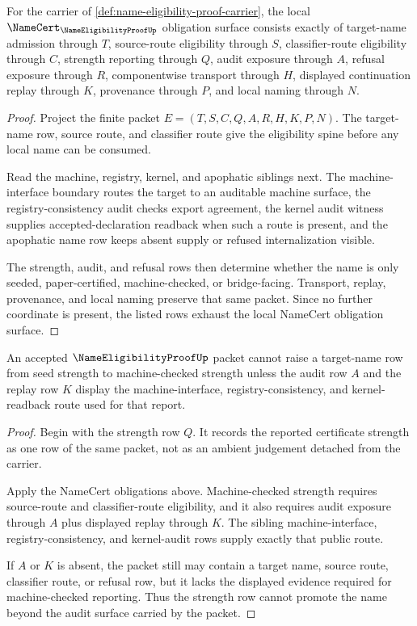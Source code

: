 \begin{theorem}
\label{thm:name-eligibility-proof-namecert-obligations}
For the carrier of \autoref{def:name-eligibility-proof-carrier}, the local $\NameCert_{\NameEligibilityProofUp}$ obligation surface consists exactly of target-name admission through $T$, source-route eligibility through $S$, classifier-route eligibility through $C$, strength reporting through $Q$, audit exposure through $A$, refusal exposure through $R$, componentwise transport through $H$, displayed continuation replay through $K$, provenance through $P$, and local naming through $N$.
\end{theorem}
\begin{proof}
Project the finite packet $E=(T,S,C,Q,A,R,H,K,P,N)$. The target-name row, source route, and classifier route give the eligibility spine before any local name can be consumed.

Read the machine, registry, kernel, and apophatic siblings next. The machine-interface boundary routes the target to an auditable machine surface, the registry-consistency audit checks export agreement, the kernel audit witness supplies accepted-declaration readback when such a route is present, and the apophatic name row keeps absent supply or refused internalization visible.

The strength, audit, and refusal rows then determine whether the name is only seeded, paper-certified, machine-checked, or bridge-facing. Transport, replay, provenance, and local naming preserve that same packet. Since no further coordinate is present, the listed rows exhaust the local NameCert obligation surface.
\end{proof}

\begin{theorem}
\label{thm:name-eligibility-proof-strength-noninflation}
An accepted $\NameEligibilityProofUp$ packet cannot raise a target-name row from seed strength to machine-checked strength unless the audit row $A$ and the replay row $K$ display the machine-interface, registry-consistency, and kernel-readback route used for that report.
\end{theorem}
\begin{proof}
Begin with the strength row $Q$. It records the reported certificate strength as one row of the same packet, not as an ambient judgement detached from the carrier.

Apply the NameCert obligations above. Machine-checked strength requires source-route and classifier-route eligibility, and it also requires audit exposure through $A$ plus displayed replay through $K$. The sibling machine-interface, registry-consistency, and kernel-audit rows supply exactly that public route.

If $A$ or $K$ is absent, the packet still may contain a target name, source route, classifier route, or refusal row, but it lacks the displayed evidence required for machine-checked reporting. Thus the strength row cannot promote the name beyond the audit surface carried by the packet.
\end{proof}

